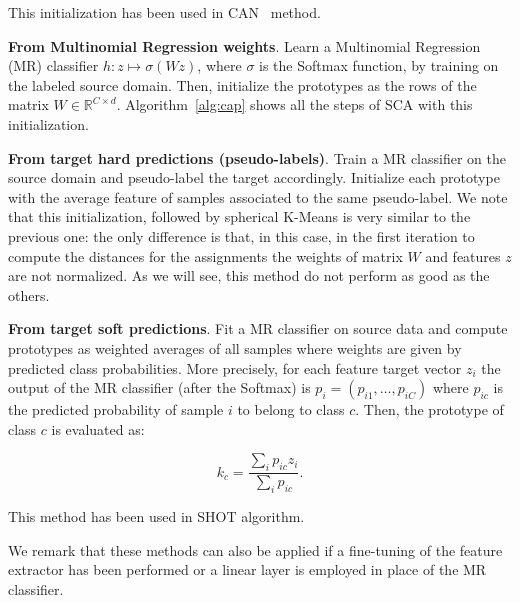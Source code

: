 \documentclass{article}
\begin{document}
This initialization has been used in CAN~\citep{kang2019contrastive} method.

\textbf{From Multinomial Regression weights}. Learn a Multinomial Regression (MR) classifier $h: z \mapsto \sigma(Wz)$, where $\sigma$ is the Softmax function, by training on the labeled source domain. Then, initialize the prototypes as the rows of the matrix $W \in \mathbb{R}^{C \times d}$. Algorithm~\ref{alg:cap} shows all the steps of SCA with this initialization.

\textbf{From target hard predictions (pseudo-labels)}. Train a MR classifier on the source domain and pseudo-label the target accordingly. Initialize each prototype with the average feature of samples associated to the same pseudo-label. We note that this initialization, followed by spherical K-Means is very similar to the previous one: the only difference is that, in this case, in the first iteration to compute the distances for the assignments the weights of matrix $W$ and features $z$ are not normalized. As we will see, this method do not perform as good as the others.

\textbf{From target soft predictions}. Fit a MR classifier on source data and compute prototypes as weighted averages of all samples where weights are given by predicted class probabilities. 
More precisely, for each feature target vector $z_i$ the output of the MR classifier (after the Softmax) is $p_i = (p_{i1}, \ldots, p_{iC})$ where $p_{ic}$ is the predicted probability of sample $i$ to belong to class $c$. Then, the prototype of class $c$ is evaluated as:

\begin{equation}
    k_c = \frac{\sum_{i} p_{ic}z_i}{\sum_{i} p_{ic}}.
\end{equation}

This method has been used in SHOT algorithm.

We remark that these methods can also be applied if a fine-tuning of the feature extractor has been performed or a linear layer is employed in place of the MR classifier. 
\end{document}
